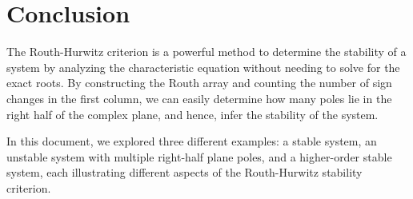 \documentclass[a4paper,12pt]{article}
\begin{document}
\section{Conclusion}

The Routh-Hurwitz criterion is a powerful method to determine the stability of a system by analyzing the characteristic equation without needing to solve for the exact roots. By constructing the Routh array and counting the number of sign changes in the first column, we can easily determine how many poles lie in the right half of the complex plane, and hence, infer the stability of the system. 

In this document, we explored three different examples: a stable system, an unstable system with multiple right-half plane poles, and a higher-order stable system, each illustrating different aspects of the Routh-Hurwitz stability criterion.
\end{document}
